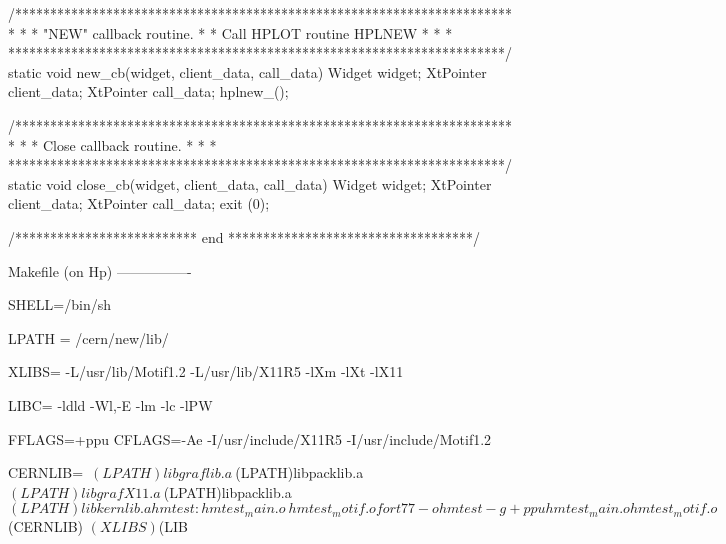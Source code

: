 /***********************************************************************
 *                                                                     *
 *   "NEW" callback routine.                                           *
 *   Call HPLOT routine HPLNEW                                         *
 *                                                                     *
 ***********************************************************************/
static void new_cb(widget, client_data,  call_data)
     Widget widget;
     XtPointer client_data;
     XtPointer call_data;
{
   hplnew_();
}



/***********************************************************************
 *                                                                     *
 *   Close callback routine.                                           *
 *                                                                     *
 ***********************************************************************/
static void close_cb(widget, client_data,  call_data)
     Widget widget;
     XtPointer client_data;
     XtPointer call_data;
{
   exit (0);
}

/**************************   end   ***********************************/


Makefile (on Hp)
----------------

SHELL=/bin/sh

LPATH = /cern/new/lib/

XLIBS= -L/usr/lib/Motif1.2 -L/usr/lib/X11R5 -lXm -lXt -lX11

LIBC=  -ldld -Wl,-E -lm -lc -lPW


FFLAGS=+ppu
CFLAGS=-Ae -I/usr/include/X11R5 -I/usr/include/Motif1.2

CERNLIB=\
        $(LPATH)libgraflib.a \
        $(LPATH)libpacklib.a \
        $(LPATH)libgrafX11.a \
        $(LPATH)libpacklib.a \
        $(LPATH)libkernlib.a

hmtest: hmtest_main.o \
        hmtest_motif.o
	fort77 -o hmtest -g +ppu hmtest_main.o hmtest_motif.o $(CERNLIB) $(XLIBS) $(LIB

